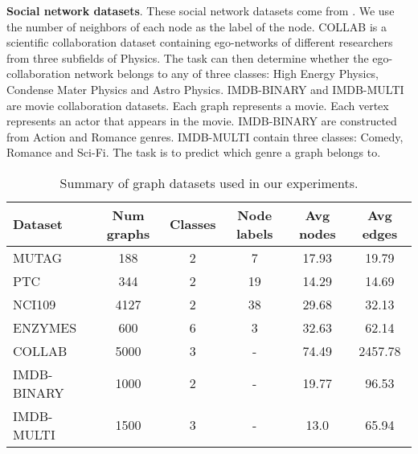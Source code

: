 \documentclass[journal]{IEEEtran}
\begin{document}
\textbf{Social network datasets}. These social network datasets come from \cite{deepgraphkerner}. We use the number of neighbors of each node as the label of the node.
COLLAB is a scientific collaboration dataset containing ego-networks of different researchers from three subfields of Physics. The task can then determine whether the ego-collaboration network belongs to any of three classes: High Energy Physics, Condense Mater Physics and Astro Physics.
IMDB-BINARY and IMDB-MULTI are movie collaboration datasets. Each graph represents a movie. Each vertex represents an actor that appears in the movie. IMDB-BINARY are constructed from Action and Romance genres. IMDB-MULTI contain three classes: Comedy, Romance and Sci-Fi. The task is to predict which genre a graph belongs to.

\begin{table*}[!t]
\centering
	\renewcommand\arraystretch{1.3}
	\caption{Summary of graph datasets used in our experiments.}
\footnotesize
	\begin{tabular}[width=0.8\linewidth]{l|ccccc} \hline  Dataset & Num graphs &Classes  &Node labels &Avg nodes &Avg edges \\
		\hline
		MUTAG \cite{mutag}   &188  &2 &7  &17.93 &19.79\\
		PTC \cite{ptc}     &344  &2 &19 &14.29 &14.69 \\
NCI109 \cite{nci1andnci109}   &4127 &2 &38 &29.68 &32.13\\
		ENZYMES \cite{enzymes}  &600  &6 &3  &32.63 &62.14\\
\hline
		COLLAB \cite{deepgraphkerner}         &5000  &3  &-  &74.49   &2457.78\\
		IMDB-BINARY \cite{deepgraphkerner}     &1000  &2  &-  &19.77   &96.53  \\
		IMDB-MULTI \cite{deepgraphkerner}     &1500  &3  &-  &13.0    &65.94 \\
\hline
	\end{tabular} \vspace{0.15cm}
	
	\label{tab1} \vspace{-0.1cm}
\end{table*}
\end{document}
